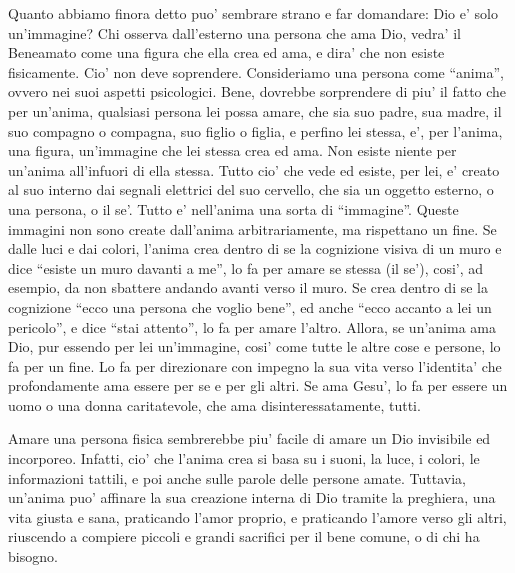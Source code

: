 Quanto abbiamo finora detto puo' sembrare strano e far domandare: Dio e' solo un'immagine? Chi osserva dall'esterno una persona che ama Dio, vedra' il Beneamato come una figura che ella crea ed ama, e dira' che non esiste fisicamente. Cio' non deve soprendere. Consideriamo una persona come ``anima'', ovvero nei suoi aspetti psicologici. Bene, dovrebbe sorprendere di piu' il fatto che per un'anima, qualsiasi persona lei possa amare, che sia suo padre, sua madre, il suo compagno o compagna, suo figlio o figlia, e perfino lei stessa, e', per l'anima, una figura, un'immagine che lei stessa crea ed ama. Non esiste niente per un'anima all'infuori di ella stessa. Tutto cio' che vede ed esiste, per lei, e' creato al suo interno dai segnali elettrici del suo cervello, che sia un oggetto esterno, o una persona, o il se'.  Tutto e' nell'anima una sorta di ``immagine''. Queste immagini non sono create dall'anima arbitrariamente, ma rispettano un fine. Se dalle luci e dai colori, l'anima crea dentro di se la cognizione visiva di un muro e dice ``esiste un muro davanti a me'', lo fa per amare se stessa (il se'), cosi', ad esempio, da non sbattere andando avanti verso il muro. Se crea dentro di se la cognizione ``ecco una persona che voglio bene'', ed anche ``ecco accanto a lei un pericolo'', e dice ``stai attento'', lo fa per amare l'altro. Allora, se un'anima ama Dio, pur essendo per lei un'immagine, cosi' come tutte le altre cose e persone, lo fa per un fine. Lo fa per direzionare con impegno la sua vita verso l'identita' che profondamente ama essere per se e per gli altri. Se ama Gesu', lo fa per essere un uomo o una donna caritatevole, che ama disinteressatamente, tutti.

Amare una persona fisica sembrerebbe piu' facile di amare un Dio invisibile ed incorporeo. Infatti, cio' che l'anima crea si basa su i suoni, la luce, i colori, le informazioni tattili, e poi anche sulle parole delle persone amate. Tuttavia, un'anima puo' affinare la sua creazione interna di Dio tramite la preghiera, una vita giusta e sana, praticando l'amor proprio, e praticando l'amore verso gli altri, riuscendo a compiere piccoli e grandi sacrifici per il bene comune, o di chi ha bisogno. 

